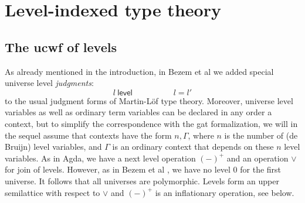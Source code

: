 \documentclass[11pt,a4paper]{article}
\theoremstyle{plain}
\theoremstyle{definition}
\newcommand{\UU}{\mathsf{U}}
\newcommand{\Level}{\mathsf{level}}
\newcommand{\level}{\mathsf{level}}
\def\UU{\mathsf{U}}
\newcommand{\N}{\mathsf{N}}
\newcommand{\ctx}{\mathrm{ctx}}
\newcommand{\ty}{\mathrm{ty}}
\newcommand{\tm}{\mathrm{tm}}
\def\U{\mathsf{U}}
\begin{document}
%
%

\section{Level-indexed type theory}\label{level-indexed-tt}

\subsection{The ucwf of levels}\label{ucwf-levels}
 As already mentioned in the introduction, in Bezem et al \cite{BezemCDE22} we added special universe level {\em judgments}:
$$
l\ \level
\hspace{5em}
l = l'
$$
to the usual judgment forms of Martin-Löf type theory. Moreover, universe level variables as well as ordinary term variables can be declared in any order a context, but to simplify the correspondence with the gat formalization, we will in the sequel assume that contexts have the form $n, \Gamma$, where $n$ is the number of (de Bruijn) level variables, and $\Gamma$ is an ordinary context that depends on these $n$ level variables.
As in Agda, we have a next level operation $(-)^+$ and an operation $\vee$ for join of levels. However, as in Bezem et al \cite{BezemCDE22}, we have no level 0 for the first universe. It follows that all universes are polymorphic.
Levels form an upper semilattice with respect to $\vee$ and $(-)^+$ is an inflationary operation, see below.
\end{document}
